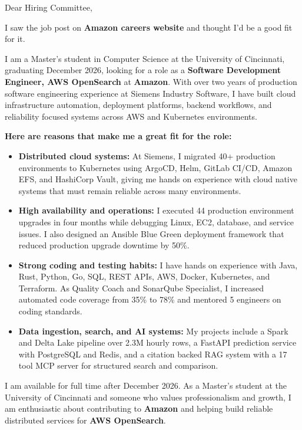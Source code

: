 \documentclass[11pt]{letter}
\date{}
\begin{document}
\begin{letter}{}

\opening{Dear Hiring Committee,}

I saw the job post on \textbf{Amazon careers website} and thought I'd be a good fit for it.

I am a Master's student in Computer Science at the University of Cincinnati, graduating December 2026, looking for a role as a \textbf{Software Development Engineer, AWS OpenSearch} at \textbf{Amazon}. With over two years of production software engineering experience at Siemens Industry Software, I have built cloud infrastructure automation, deployment platforms, backend workflows, and reliability focused systems across AWS and Kubernetes environments.

\textbf{Here are reasons that make me a great fit for the role:}

\begin{itemize}[leftmargin=*, itemsep=0.35em]
    \item \textbf{Distributed cloud systems:} At Siemens, I migrated 40+ production environments to Kubernetes using ArgoCD, Helm, GitLab CI/CD, Amazon EFS, and HashiCorp Vault, giving me hands on experience with cloud native systems that must remain reliable across many environments.

    \item \textbf{High availability and operations:} I executed 44 production environment upgrades in four months while debugging Linux, EC2, database, and service issues. I also designed an Ansible Blue Green deployment framework that reduced production upgrade downtime by 50\%.

    \item \textbf{Strong coding and testing habits:} I have hands on experience with Java, Rust, Python, Go, SQL, REST APIs, AWS, Docker, Kubernetes, and Terraform. As Quality Coach and SonarQube Specialist, I increased automated code coverage from 35\% to 78\% and mentored 5 engineers on coding standards.

    \item \textbf{Data ingestion, search, and AI systems:} My projects include a Spark and Delta Lake pipeline over 2.3M hourly rows, a FastAPI prediction service with PostgreSQL and Redis, and a citation backed RAG system with a 17 tool MCP server for structured search and comparison.
\end{itemize}

I am available for full time after December 2026. As a Master's student at the University of Cincinnati and someone who values professionalism and growth, I am enthusiastic about contributing to \textbf{Amazon} and helping build reliable distributed services for \textbf{AWS OpenSearch}.


\end{letter}
\end{document}
